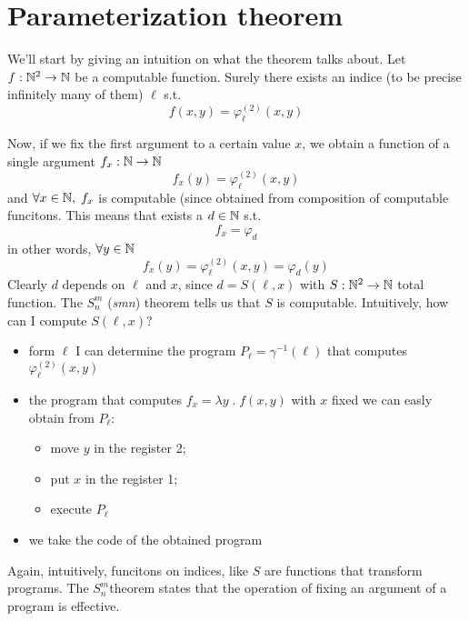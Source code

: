 \chapter {Parameterization theorem}
\newcommand{\smn}{$S_n^m$}

We'll start by giving an intuition on what the theorem talks
about. Let $f : \mathbb{N}^2 \rightarrow \mathbb{N}$ be a computable
function. Surely there exists an indice (to be precise infinitely many
of them) $\ell$ s.t. \[f(x,y) = \varphi_\ell^{(2)}(x,y)\]

Now, if we fix the first argument to a certain value $x$, we obtain a
function of a single argument $f_x : \mathbb{N} \rightarrow \mathbb{N}$
\[f_x(y) = \varphi_\ell^{(2)}(x,y)\] and $\forall x \in \mathbb{N}, \; f_x$
is computable (since obtained from composition of computable
funcitons. This means that exists a $d \in \mathbb{N}$ s.t.
\[f_x = \varphi_d\] in other words, $\forall y \in \mathbb{N}$
\[f_x(y) = \varphi_\ell^{(2)}(x,y) = \varphi_d(y)\] Clearly $d$
depends on $\ell$ and $x$, since $d = S(\ell, x)$ with
$S : \mathbb{N}^2 \rightarrow \mathbb{N}$ total function. The \smn
(\textit{smn}) theorem tells us that $S$ is computable. Intuitively,
how can I compute $S(\ell, x)$?

\begin{itemize}
\item form $\ell$ I can determine the program
  $P_\ell = \gamma^{-1}(\ell)$ that computes $\varphi_\ell^{(2)}(x,y)$
\item the program that computes $f_x = \lambda y \; . \; f(x,y)$ with
  $x$ fixed we can easly obtain from $P_\ell$:
  \begin{itemize}
  \item move $y$ in the register 2;
  \item put $x$ in the register 1;
  \item execute $P_\ell$
  \end{itemize}
\item we take the code of the obtained program
\end{itemize}

Again, intuitively, funcitons on indices, like $S$ are functions that
transform programs. The \smn theorem states that the operation of
fixing an argument of a program is effective.

